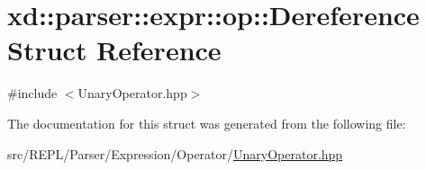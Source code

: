 \hypertarget{structxd_1_1parser_1_1expr_1_1op_1_1_dereference}{}\section{xd\+:\+:parser\+:\+:expr\+:\+:op\+:\+:Dereference Struct Reference}
\label{structxd_1_1parser_1_1expr_1_1op_1_1_dereference}


{\ttfamily \#include $<$Unary\+Operator.\+hpp$>$}



The documentation for this struct was generated from the following file\+:\begin{DoxyCompactItemize}
\item 
src/\+R\+E\+P\+L/\+Parser/\+Expression/\+Operator/\mbox{\hyperlink{_unary_operator_8hpp}{Unary\+Operator.\+hpp}}\end{DoxyCompactItemize}
